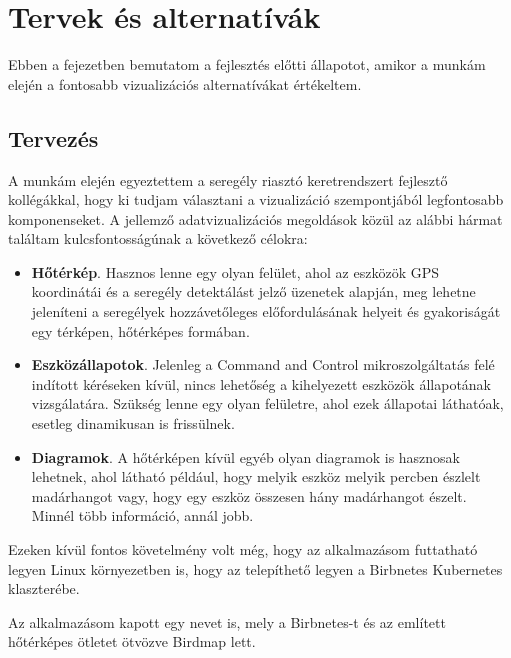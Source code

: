 \chapter{Tervek és alternatívák}
\label{chapt:birdmap-introduction}
Ebben a fejezetben bemutatom a fejlesztés előtti állapotot, amikor a munkám elején a fontosabb vizualizációs alternatívákat értékeltem.

\section{Tervezés}
A munkám elején egyeztettem a seregély riasztó keretrendszert fejlesztő kollégákkal, 
hogy ki tudjam választani a vizualizáció szempontjából legfontosabb komponenseket.
A jellemző adatvizualizációs megoldások közül az alábbi hármat találtam kulcsfontosságúnak a következő célokra:
\begin{itemize}
    \item \textbf{Hőtérkép}. Hasznos lenne egy olyan felület, ahol az eszközök GPS koordinátái és a seregély detektálást jelző üzenetek alapján, meg lehetne jeleníteni a seregélyek hozzávetőleges előfordulásának helyeit és gyakoriságát egy térképen, hőtérképes formában.
    \item \textbf{Eszközállapotok}. Jelenleg a Command and Control mikroszolgáltatás felé indított kéréseken kívül, nincs lehetőség a kihelyezett eszközök állapotának vizsgálatára. Szükség lenne egy olyan felületre, ahol ezek állapotai láthatóak, esetleg dinamikusan is frissülnek.
    \item \textbf{Diagramok}. A hőtérképen kívül egyéb olyan diagramok is hasznosak lehetnek, ahol látható például, hogy melyik eszköz melyik percben észlelt madárhangot vagy, hogy egy eszköz összesen hány madárhangot észelt. Minnél több információ, annál jobb.
\end{itemize}
Ezeken kívül fontos követelmény volt még, hogy az alkalmazásom futtatható legyen Linux környezetben is, hogy az telepíthető legyen a Birbnetes Kubernetes \cite{kubernetes} klaszterébe.

Az alkalmazásom kapott egy nevet is, mely a Birbnetes-t és az említett hőtérképes ötletet ötvözve Birdmap lett.
